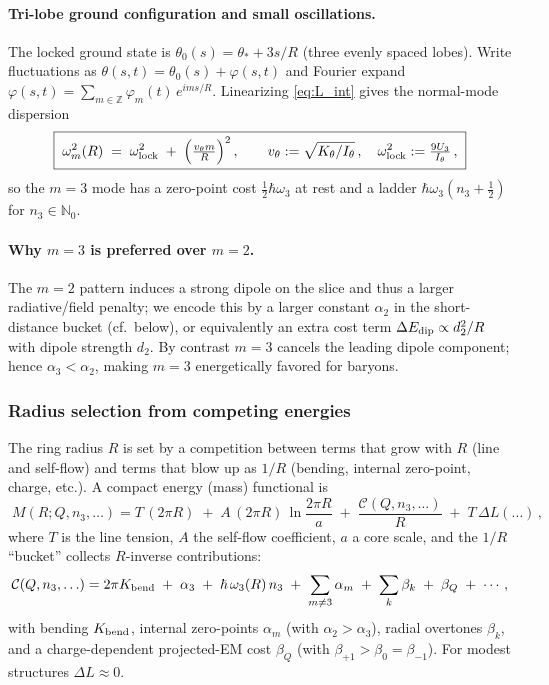 \paragraph{Tri-lobe ground configuration and small oscillations.}
The locked ground state is $\theta_0(s)=\theta_*+3s/R$ (three evenly spaced lobes).
Write fluctuations as $\theta(s,t)=\theta_0(s)+\varphi(s,t)$ and Fourier expand
$\varphi(s,t)=\sum_{m\in\mathbb Z}\varphi_m(t)\,e^{i m s/R}$.
Linearizing \eqref{eq:L_int} gives the normal-mode dispersion
\begin{equation}
\boxed{\;
\omega_m^2(R) \;=\; \omega_{\rm lock}^2 \;+\; \Big(\tfrac{v_\theta m}{R}\Big)^2\,,\qquad
v_\theta:=\sqrt{K_\theta/I_\theta}\,,\quad
\omega_{\rm lock}^2:=\tfrac{9 U_3}{I_\theta}\,,
\;}
\label{eq:omega_m}
\end{equation}
so the $m{=}3$ mode has a zero-point cost $\tfrac{1}{2}\hbar\omega_3$ at rest and a ladder $\hbar\omega_3(n_3+\tfrac12)$ for $n_3\!\in\!\mathbb N_0$.

\paragraph{Why $m{=}3$ is preferred over $m{=}2$.}
The $m{=}2$ pattern induces a strong dipole on the slice and thus a larger radiative/field penalty; we encode this by a larger constant $\alpha_2$ in the short-distance bucket (cf.\ below), or equivalently an extra cost term $\Delta E_{\rm dip}\propto d_2^2/R$ with dipole strength $d_2$.
By contrast $m{=}3$ cancels the leading dipole component; hence $\alpha_3<\alpha_2$, making $m{=}3$ energetically favored for baryons.

\subsubsection{Radius selection from competing energies}
\label{sec:baryons-inside:Rstar}
The ring radius $R$ is set by a competition between terms that grow with $R$ (line and self-flow) and terms that blow up as $1/R$ (bending, internal zero-point, charge, etc.).
A compact energy (mass) functional is
\begin{equation}
\boxed{\;
M(R;Q,n_3,\ldots)
= T\,(2\pi R) \;+\; A\,(2\pi R)\,\ln\!\frac{2\pi R}{a}
\;+\; \frac{\mathcal C(Q,n_3,\ldots)}{R}
\;+\; T\,\Delta L(\ldots)\,,
\;}
\label{eq:M_collect}
\end{equation}
where $T$ is the line tension, $A$ the self-flow coefficient, $a$ a core scale,
and the $1/R$ ``bucket'' collects $R$-inverse contributions:
\begin{equation}
\mathcal C(Q,n_3,\ldots)
= 2\pi K_{\rm bend}\;+\; \alpha_3 \;+\; \hbar\,\omega_3(R)\,n_3\;+\;\sum_{m\neq3}\alpha_m\;+\;\sum_k \beta_k\;+\;\beta_Q\;+\;\cdots,
\label{eq:C_bucket}
\end{equation}
with bending $K_{\rm bend}$, internal zero-points $\alpha_m$ (with $\alpha_2>\alpha_3$), radial overtones $\beta_k$, and a charge-dependent projected-EM cost $\beta_Q$ (with $\beta_{+1}>\beta_{0}=\beta_{-1}$).
For modest structures $\Delta L\!\approx\!0$.


